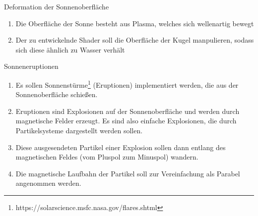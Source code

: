 \documentclass{article}
\begin{document}
\begin{enumerate}
    {\bfseries\large\item Deformation der Sonnenoberfläche}
    \begin{enumerate}
      \item Die Oberfläche der Sonne besteht aus Plasma, welches sich wellenartig bewegt
      \item Der zu entwickelnde Shader soll die Oberfläche der Kugel manpulieren, sodass
	sich diese ähnlich zu Wasser verhält
    \end{enumerate}

    \vspace{0.5cm}

    {\bfseries\large\item Sonneneruptionen}
    \begin{enumerate}
      \item Es sollen
        Sonnenstürme\footnote{https://solarscience.msfc.nasa.gov/flares.shtml}
        (Eruptionen) implementiert werden, die aus der Sonnenoberfläche
        schießen.
      \item Eruptionen sind Explosionen auf der Sonnenoberfläche und werden
        durch magnetische Felder erzeugt. Es sind also einfache Explosionen, die
        durch Partikelsysteme dargestellt werden sollen.
      \item Diese ausgesendeten Partikel einer Explosion sollen dann entlang des
        magnetischen Feldes (vom Pluspol zum Minuspol) wandern.
      \item Die magnetische Laufbahn der Partikel soll zur Vereinfachung als
        Parabel angenommen werden.
    \end{enumerate}

  \end{enumerate}
\end{document}
